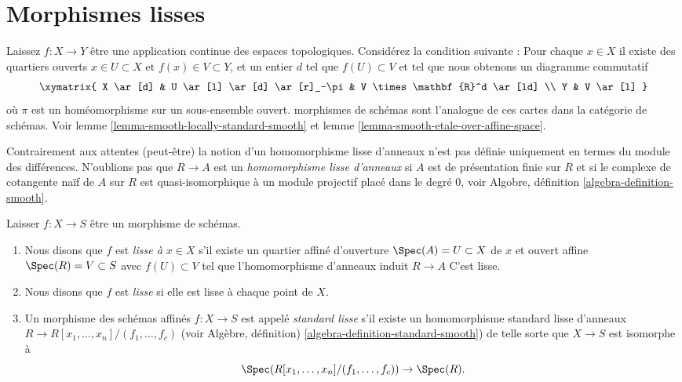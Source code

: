 \section{Morphismes lisses}
\label{section-smooth}

\noindent
Laissez $f : X \to Y$ être une application continue des espaces topologiques. Considérez la condition suivante : Pour chaque $x \in X$ il existe des quartiers ouverts $x \in U \subset X$ et $f(x) \in V \subset Y$, et un entier $d$ tel que $f(U) \subset V$ et tel que nous obtenons un diagramme commutatif $$
\xymatrix{
X \ar[d] &
U \ar[l] \ar[d] \ar[r]_-\pi &
V \times \mathbf{R}^d \ar[ld] \\
Y & V \ar[l]
}
$$ où $\pi$ est un homéomorphisme sur un sous-ensemble ouvert. morphismes de schémas sont l'analogue de ces cartes dans la catégorie de schémas. Voir lemme \ref{lemma-smooth-locally-standard-smooth} et lemme \ref{lemma-smooth-etale-over-affine-space}.

\medskip\noindent
Contrairement aux attentes (peut-être) la notion d'un homomorphisme lisse d'anneaux n'est pas définie uniquement en termes du module des différences. N'oublions pas que $R \to A$ est un {\it homomorphisme lisse d'anneaux} si $A$ est de présentation finie sur $R$ et si le complexe de cotangente naïf de $A$ sur $R$ est quasi-isomorphique à un module projectif placé dans le degré $0$, voir Algobre, définition \ref{algebra-definition-smooth}.

\begin{definition}

\label{definition-smooth}

Laisser $f : X \to S$ être un morphisme de schémas.

\begin{enumerate}

\item Nous disons que $f$ est {\it lisse à $x \in X$} s'il existe un quartier affiné d'ouverture $\Spec(A) = U \subset X$
de $x$ et ouvert affine $\Spec(R) = V \subset S$
avec $f(U) \subset V$ tel que l'homomorphisme d'anneaux induit
$R \to A$ C'est lisse.
\item Nous disons que $f$ est {\it lisse} si elle est lisse à chaque point de $X$.
\item Un morphisme des schémas affinés $f : X \to S$
est appelé {\it standard lisse} s'il existe un homomorphisme standard lisse d'anneaux $R \to R[x_1, \ldots, x_n]/(f_1, \ldots, f_c)$ (voir Algèbre, définition) \ref{algebra-definition-standard-smooth}) de telle sorte que $X \to S$ est isomorphe à
$$
\Spec(R[x_1, \ldots, x_n]/(f_1, \ldots, f_c)) \to \Spec(R).
$$

\end{enumerate}

\end{definition}

